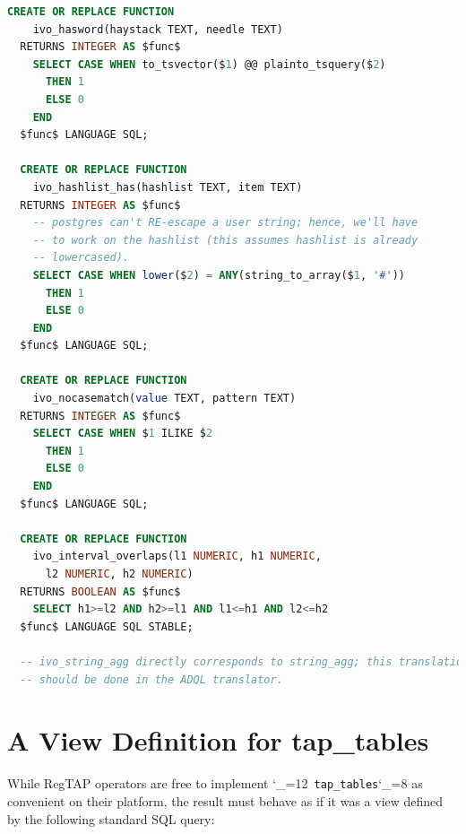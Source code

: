 \documentclass[11pt,a4paper]{ivoa}
\makeatletter
\def\rtent#1{\texttt{\color{rtcolor}\verb|#1|}}
\def\makeunderscoreletter{\catcode`\_=12}
\def\makeunderscoresubscript{\catcode`\_=8}
\def\rtent{\makeunderscoreletter\relax\rt@nt}
\def\rt@nt#1{\texttt{\color{rtcolor} #1}\makeunderscoresubscript{}}
\makeatother
\begin{document}
\begin{lstlisting}[language=SQL,basicstyle=\footnotesize]
  CREATE OR REPLACE FUNCTION
    ivo_hasword(haystack TEXT, needle TEXT)
  RETURNS INTEGER AS $func$
    SELECT CASE WHEN to_tsvector($1) @@ plainto_tsquery($2)
      THEN 1
      ELSE 0
    END
  $func$ LANGUAGE SQL;

  CREATE OR REPLACE FUNCTION
    ivo_hashlist_has(hashlist TEXT, item TEXT)
  RETURNS INTEGER AS $func$
    -- postgres can't RE-escape a user string; hence, we'll have
    -- to work on the hashlist (this assumes hashlist is already
    -- lowercased).
    SELECT CASE WHEN lower($2) = ANY(string_to_array($1, '#'))
      THEN 1
      ELSE 0
    END
  $func$ LANGUAGE SQL;

  CREATE OR REPLACE FUNCTION
    ivo_nocasematch(value TEXT, pattern TEXT)
  RETURNS INTEGER AS $func$
    SELECT CASE WHEN $1 ILIKE $2
      THEN 1
      ELSE 0
    END
  $func$ LANGUAGE SQL;

  CREATE OR REPLACE FUNCTION
    ivo_interval_overlaps(l1 NUMERIC, h1 NUMERIC,
      l2 NUMERIC, h2 NUMERIC)
  RETURNS BOOLEAN AS $func$
    SELECT h1>=l2 AND h2>=l1 AND l1<=h1 AND l2<=h2
  $func$ LANGUAGE SQL STABLE;

  -- ivo_string_agg directly corresponds to string_agg; this translation
  -- should be done in the ADQL translator.
\end{lstlisting}

\section{A View Definition for tap\_tables}
\label{app:tap-table-viewdef}

While RegTAP operators are free to implement \rtent{tap_tables} as
convenient on their platform, the result must behave as if it was a view
defined by the following standard SQL query:
\end{document}
